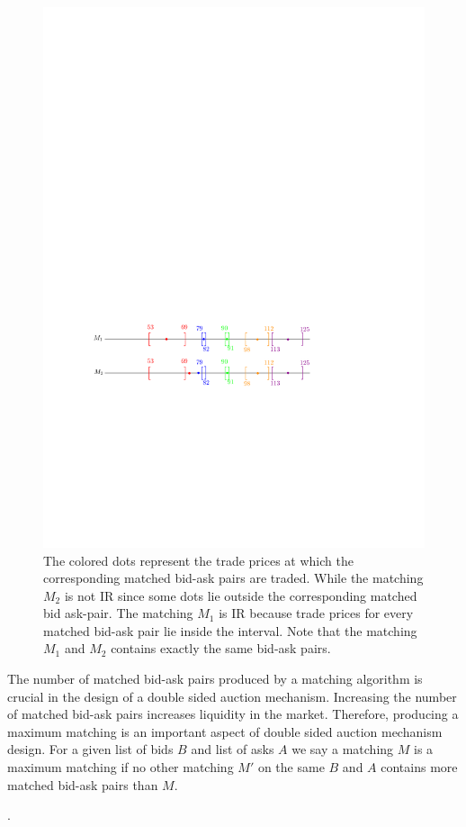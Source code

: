\documentclass[a4paper,UKenglish,cleveref, autoref]{lipics-v2019}
\begin{document}
\begin{figure}[h!]
\centering
\includegraphics[width=.8\textwidth]{brack_IR.pdf}
\caption{ The colored dots represent the trade prices at which the corresponding matched bid-ask pairs are traded. While the matching $M_2$ is not IR since some dots lie outside the corresponding matched bid ask-pair. The matching $M_1$ is IR because trade prices for every matched bid-ask pair  lie inside the interval. Note that the matching $M_1$ and $M_2$ contains exactly the same bid-ask pairs.}
\label{fig:IR}
\end{figure}

The number of matched bid-ask pairs produced by a matching algorithm is crucial in the design of a double sided auction mechanism. Increasing the number of matched bid-ask pairs increases  liquidity in the market. Therefore, producing a maximum matching is an important aspect of double sided auction mechanism design. For a given list of bids $B$ and list of asks $A$ we say a matching $M$ is  a maximum matching if no other matching $M'$ on the same $B$ and $A$ contains more matched bid-ask pairs than $M$. 

\begin{definition}
.
\end{definition}
\end{document}
